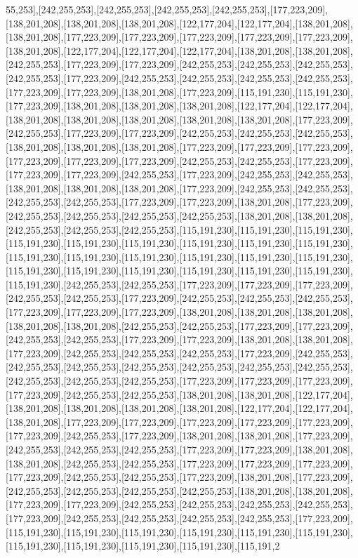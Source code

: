 55,253],[242,255,253],[242,255,253],[242,255,253],[242,255,253],[177,223,209],[138,201,208],[138,201,208],[138,201,208],[122,177,204],[122,177,204],[138,201,208],[138,201,208],[177,223,209],[177,223,209],[177,223,209],[177,223,209],[177,223,209],[138,201,208],[122,177,204],[122,177,204],[122,177,204],[138,201,208],[138,201,208],[242,255,253],[177,223,209],[177,223,209],[242,255,253],[242,255,253],[242,255,253],[242,255,253],[177,223,209],[242,255,253],[242,255,253],[242,255,253],[242,255,253],[177,223,209],[177,223,209],[138,201,208],[177,223,209],[115,191,230],[115,191,230],[177,223,209],[138,201,208],[138,201,208],[138,201,208],[122,177,204],[122,177,204],[138,201,208],[138,201,208],[138,201,208],[138,201,208],[138,201,208],[177,223,209],[242,255,253],[177,223,209],[177,223,209],[242,255,253],[242,255,253],[242,255,253],[138,201,208],[138,201,208],[138,201,208],[177,223,209],[177,223,209],[177,223,209],[177,223,209],[177,223,209],[177,223,209],[242,255,253],[242,255,253],[177,223,209],[177,223,209],[177,223,209],[242,255,253],[177,223,209],[242,255,253],[242,255,253],[138,201,208],[138,201,208],[138,201,208],[177,223,209],[242,255,253],[242,255,253],[242,255,253],[242,255,253],[177,223,209],[177,223,209],[138,201,208],[177,223,209],[242,255,253],[242,255,253],[242,255,253],[242,255,253],[138,201,208],[138,201,208],[242,255,253],[242,255,253],[242,255,253],[115,191,230],[115,191,230],[115,191,230],[115,191,230],[115,191,230],[115,191,230],[115,191,230],[115,191,230],[115,191,230],[115,191,230],[115,191,230],[115,191,230],[115,191,230],[115,191,230],[115,191,230],[115,191,230],[115,191,230],[115,191,230],[115,191,230],[115,191,230],[115,191,230],[115,191,230],[242,255,253],[242,255,253],[177,223,209],[177,223,209],[177,223,209],[242,255,253],[242,255,253],[177,223,209],[242,255,253],[242,255,253],[242,255,253],[177,223,209],[177,223,209],[177,223,209],[138,201,208],[138,201,208],[138,201,208],[138,201,208],[138,201,208],[242,255,253],[242,255,253],[177,223,209],[177,223,209],[242,255,253],[242,255,253],[177,223,209],[177,223,209],[138,201,208],[138,201,208],[177,223,209],[242,255,253],[242,255,253],[242,255,253],[177,223,209],[242,255,253],[242,255,253],[242,255,253],[242,255,253],[242,255,253],[242,255,253],[242,255,253],[242,255,253],[242,255,253],[242,255,253],[177,223,209],[177,223,209],[177,223,209],[177,223,209],[242,255,253],[242,255,253],[138,201,208],[138,201,208],[122,177,204],[138,201,208],[138,201,208],[138,201,208],[138,201,208],[122,177,204],[122,177,204],[138,201,208],[177,223,209],[177,223,209],[177,223,209],[177,223,209],[177,223,209],[177,223,209],[242,255,253],[177,223,209],[138,201,208],[138,201,208],[177,223,209],[242,255,253],[242,255,253],[242,255,253],[177,223,209],[177,223,209],[138,201,208],[138,201,208],[242,255,253],[242,255,253],[177,223,209],[177,223,209],[177,223,209],[177,223,209],[242,255,253],[242,255,253],[177,223,209],[138,201,208],[177,223,209],[242,255,253],[242,255,253],[242,255,253],[242,255,253],[138,201,208],[138,201,208],[177,223,209],[177,223,209],[242,255,253],[242,255,253],[242,255,253],[242,255,253],[177,223,209],[242,255,253],[242,255,253],[242,255,253],[242,255,253],[177,223,209],[115,191,230],[115,191,230],[115,191,230],[115,191,230],[115,191,230],[115,191,230],[115,191,230],[115,191,230],[115,191,230],[115,191,230],[115,191,2
